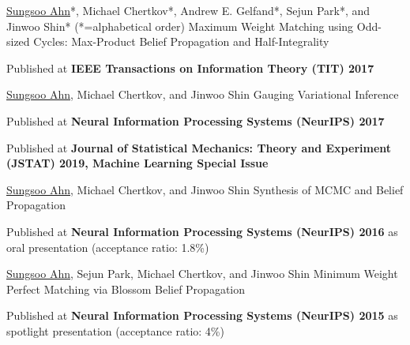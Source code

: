 \begin{cventries}
  \cventrypublication
    {\underline{Sungsoo Ahn}*, Michael Chertkov*, Andrew E. Gelfand*, Sejun Park*, and Jinwoo Shin* (*=alphabetical order)}
    {Maximum Weight Matching using Odd-sized Cycles: Max-Product Belief Propagation and Half-Integrality}
    {
      \begin{cvitems}
        \item {Published at \textbf{IEEE Transactions on Information Theory (TIT) 2017}}
      \end{cvitems}
    }
    \vspace{.1in}

  \cventrypublication
    {\underline{Sungsoo Ahn}, Michael Chertkov, and Jinwoo Shin}
    {Gauging Variational Inference}
    {
      \begin{cvitems}
        \item {Published at \textbf{Neural Information Processing Systems (NeurIPS) 2017}}
        \item {Published at \textbf{Journal of Statistical Mechanics: Theory and Experiment (JSTAT) 2019, Machine Learning Special Issue}}
      \end{cvitems}
    }
    \vspace{.1in}

  \cventrypublication
    {\underline{Sungsoo Ahn}, Michael Chertkov, and Jinwoo Shin}
    {Synthesis of MCMC and Belief Propagation}
    {
      \begin{cvitems}
        \item {Published at \textbf{Neural Information Processing Systems (NeurIPS) 2016} as oral presentation (acceptance ratio: 1.8\%)}
      \end{cvitems}
    }
    \vspace{.1in}

  \cventrypublication
    {\underline{Sungsoo Ahn}, Sejun Park, Michael Chertkov, and Jinwoo Shin}
    {Minimum Weight Perfect Matching via Blossom Belief Propagation}
    {
      \begin{cvitems}
        \item {Published at \textbf{Neural Information Processing Systems (NeurIPS) 2015} as spotlight presentation (acceptance ratio: 4\%)}
      \end{cvitems}
    }
\end{cventries}

\vspace{.2in}

\begin{cventries}
\end{cventries}
